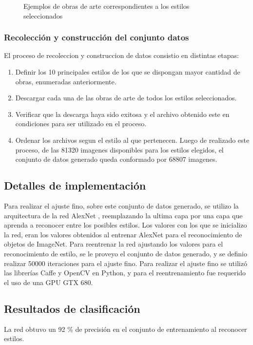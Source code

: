 \documentclass[a4paper,11pt,spanish]{book}
\begin{document}
\begin{figure}
\begin{center}
\begin{tabularx}{\textwidth}{@{}cXX@{}}
	  \end{tabularx}

	  \caption{Ejemplos de obras de arte correspondientes a los estilos seleccionados}\label{mosaico_estilos}
	  \end{center}

	\end{figure}

      \subsubsection{Recolección y construcción del conjunto datos}
	El proceso de recoleccion y construccion de datos consistio en distintas etapas:
	\begin{enumerate}
	 \item Definir los 10 principales estilos de los que se dispongan mayor cantidad de obras, enumeradas anteriormente.
	 \item Descargar cada una de las obras de arte de todos los estilos seleccionados.
	 \item Verificar que la descarga haya sido exitosa y el archivo obtenido este en condiciones para ser utilizado en el proceso.
	 \item Ordenar los archivos segun el estilo al que pertenecen.
	 Luego de realizado este proceso, de las 81320 imagenes disponibles para los estilos elegidos, el conjunto de datos generado queda conformado por 68807 imagenes.
	\end{enumerate}

    \subsection{Detalles de implementación}
      Para realizar el ajuste fino, sobre este conjunto de datos generado, se utilizo la arquitectura de la red AlexNet \cite{AlexNet}, reemplazando la ultima capa por una capa que
      aprenda a reconocer entre los posibles estilos. Los valores con los que se inicializo la red, eran los valores obtenidos al entrenar AlexNet para el reconocimiento de objetos de ImageNet.
      Para reentrenar la red ajustando los valores para el reconocimiento de estilo, se le proveyo el conjunto de datos generado, y se definio realizar 50000 iteraciones para el ajuste fino.
      Para realizar el ajuste fino se utilizó las librerías Caffe y OpenCV en Python, y para el reentrenamiento fue requerido el uso de una GPU GTX 680.

    \subsection{Resultados de clasificación}
    La red obtuvo un 92 \% de precisión en el conjunto de entrenamiento al reconocer estilos.
\end{document}
